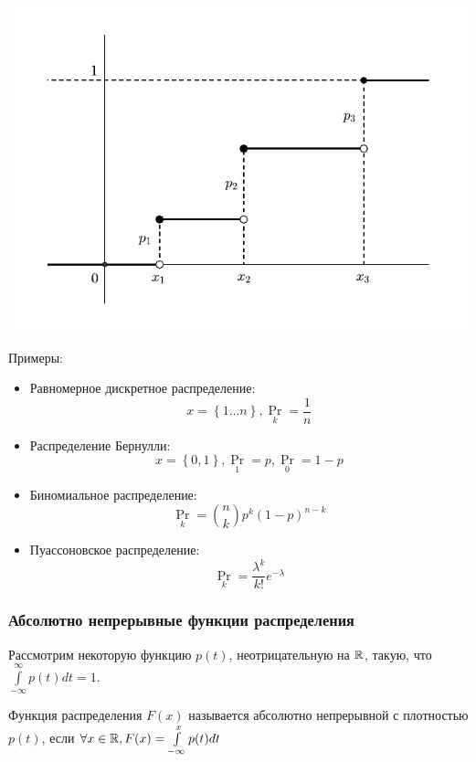     \includegraphics[width=15cm]{Lec_8_1.pdf}

    Примеры:

    \begin{itemize}
        \item Равномерное дискретное распределение:
            \[
                x = \left\{ 1\ldots n \right\}, \Pr_k = \frac{1}{n}
            \]

        \item Распределение Бернулли:
            \[
                x = \left\{ 0, 1 \right\}, \Pr_1 = p, \Pr_0 = 1-p
            \]
        \item Биномиальное распределение:
            \[
                \Pr_k = \binom{n}{k}p^k(1-p)^{n-k}
            \]
        \item Пуассоновское распределение:
            \[
                \Pr_k = \frac{\lambda^k}{k!}e^{-\lambda}
            \]
    \end{itemize}

\subsubsection{Абсолютно непрерывные функции распределения}

    Рассмотрим некоторую функцию $p(t)$, неотрицательную на $\mathbb{R}$, такую, что
    $\int\limits_{-\infty}^{\infty} p(t)dt = 1$.

    \begin{definition}
        Функция распределения $F(x)$ называется абсолютно непрерывной с плотностью $p(t)$, если $\forall x
        \in \mathbb{R}, F(x) = \int\limits_{-\infty}^{x} p(t)dt$
    \end{definition}

